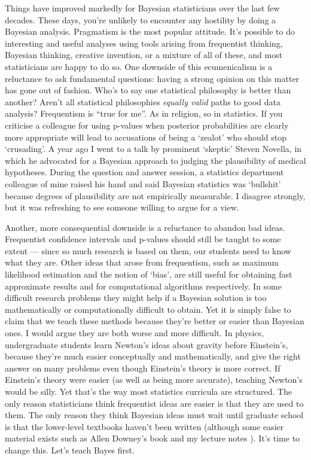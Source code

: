 \documentclass[a4paper, 12pt]{article}
\begin{document}
Things have improved markedly for Bayesian statisticians over the last few
decades. These days, you're unlikely to encounter any hostility by doing
a Bayesian analysis. Pragmatism is the most popular attitude.
It's possible to do interesting and useful analyses using tools
arising from frequentist thinking, Bayesian thinking, creative invention, or
a mixture of all of these, and most statisticians are happy to do so.
One downside of this ecumenicalism is a reluctance to ask fundamental
questions: having a strong opinion on this matter has gone out of fashion.
Who's to say one statistical philosophy is better than
another? Aren't all statistical philosophies {\it equally valid} paths to good
data analysis? Frequentism is ``true for me''. As in religion, so in statistics.
If you criticise a colleague for using p-values when posterior probabilities
are clearly more appropriate will lead to accusations of being a `zealot'
\citep{simply_statistics} who should stop `crusading'.
A year ago I went to a talk by prominent `skeptic' Steven Novella, in which
he advocated for a Bayesian approach to judging the plausibility of medical
hypotheses. During the question and answer session, a statistics department colleague of mine raised his hand and said Bayesian statistics was `bullshit' because degrees of plausibility are not empirically measurable. I disagree
strongly, but it was refreshing to see someone willing to argue for a view.

Another, more consequential downside is a reluctance to abandon bad ideas.
Frequentist confidence intervals and p-values should still be taught to some
extent --- since so much research is based on them, our students need to know what
they are. Other ideas that arose from frequentism, such as maximum likelihood
estimation and the notion of `bias', are still useful for obtaining fast
approximate results and for computational algorithms respectively.
In some difficult research problems they might help if a Bayesian solution is too mathematically or computationally difficult to obtain.
Yet it is simply false to claim that we teach these methods because they're
better or easier than Bayesian ones. I would argue they are both worse and
more difficult. In physics, undergraduate students learn Newton's ideas about
gravity before Einstein's, because they're much easier conceptually and
mathematically, and give the right answer on many problems even though
Einstein's theory is more correct. If Einstein's theory
were easier (as well as being more accurate), teaching Newton's would be silly. Yet
that's the way most statistics curricula are structured.
The only reason
statisticians think frequentist ideas are easier is that they are used to them.
The only reason they think Bayesian ideas must wait until graduate school is
that the lower-level textbooks haven't been written (although some easier material
exists such as Allen Downey's book \citep{downey} and my lecture
notes \citep{331}). It's time to change this. Let's teach Bayes first.
\end{document}
